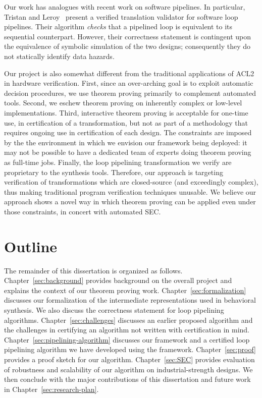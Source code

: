 Our work has analogues with recent work on software
pipelines.  In particular, Tristan and
Leroy~\cite{tl:software-popl10} present a verified
translation validator for software loop pipelines. Their
algorithm {\em checks} that a pipelined loop is equivalent
to its sequential counterpart.  However, their correctness
statement is contingent upon the equivalence of symbolic
simulation of the two designs; consequently they do not
statically identify data hazards.

Our project is also somewhat different from the
traditional applications of ACL2 in hardware verification.
First, since an over-arching goal is to exploit automatic
decision procedures, we use theorem proving primarily to
complement automated tools.  Second, we eschew theorem
proving on inherently complex or low-level implementations.
Third, interactive theorem proving is acceptable for
one-time use, %
 in certification of a transformation, but not as part of a methodology that
requires ongoing use in certification of each design.  The
constraints are imposed by the the environment in which we
envision our framework being deployed: it may not be
possible to have a dedicated team of experts doing theorem
proving as full-time jobs.  Finally, the loop pipelining transformation
we verify are proprietary to the synthesis tools. Therefore, our approach is
targeting verification of transformations
which are closed-source (and exceedingly complex), thus
making traditional program verification techniques unusable.
We believe our approach shows a novel way in which theorem
proving can be applied even under those constraints, in
concert with automated SEC.

\section {Outline}
The remainder of this dissertation is organized as
follows. Chapter~\ref{sec:background} provides background on the overall project and explains the context
of our theorem proving work. Chapter~\ref{sec:formalization}
discusses our formalization of the intermediate representations used in behavioral synthesis.
We also discuss the correctness statement for loop pipelining algorithms.
Chapter~\ref{sec:challenges} discusses an earlier proposed
algorithm and the challenges in certifying an algorithm not written with certification in mind.
Chapter~\ref{sec:pipelining-algorithm} discusses our
framework and a certified loop pipelining algorithm we have developed using the framework. Chapter~\ref{sec:proof} provides a proof sketch for our algorithm. Chapter~\ref{sec:SEC} provides evaluation of robustness and scalability of our algorithm on
industrial-strength designs. We then conclude with the major contributions of this dissertation and future work in Chapter~\ref{sec:research-plan}.
